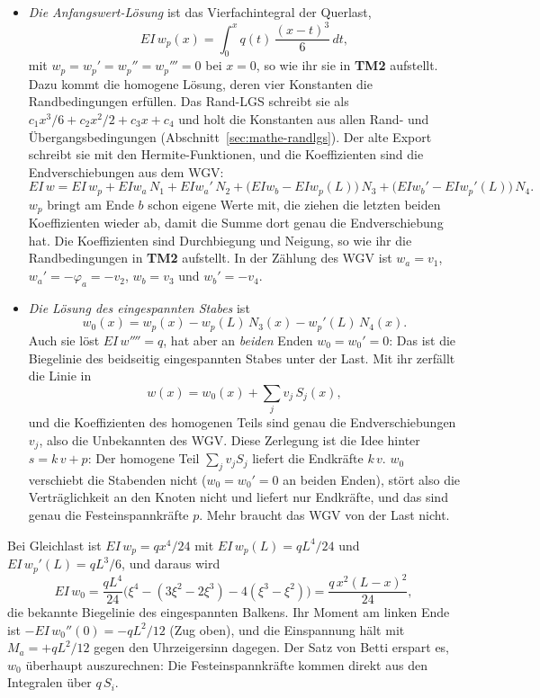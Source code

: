 \begin{itemize}
  \item \emph{Die Anfangswert-Lösung} ist das Vierfachintegral der Querlast,
        \[
          EI\,w_p(x) = \int_0^x q(t)\,\frac{(x-t)^3}{6}\,dt ,
        \]
        mit $w_p = w_p' = w_p'' = w_p''' = 0$ bei $x = 0$, so wie ihr sie in \textbf{TM2} aufstellt.
        Dazu kommt die homogene Lösung, deren vier Konstanten die Randbedingungen erfüllen. Das
        Rand-LGS schreibt sie als $c_1 x^3/6 + c_2 x^2/2 + c_3 x + c_4$ und holt die Konstanten aus
        allen Rand- und Übergangsbedingungen (Abschnitt~\ref{sec:mathe-randlgs}). Der alte Export
         schreibt sie mit den Hermite-Funktionen, und die Koeffizienten sind die
        Endverschiebungen aus dem WGV:
        \[
          EI\,w = EI\,w_p + EI w_a\,N_1 + EI w_a'\,N_2 + \bigl(EI w_b - EI w_p(L)\bigr)\,N_3
                  + \bigl(EI w_b' - EI w_p'(L)\bigr)\,N_4 .
        \]
        $w_p$ bringt am Ende $b$ schon eigene Werte mit, die ziehen die letzten beiden Koeffizienten
        wieder ab, damit die Summe dort genau die Endverschiebung hat. Die Koeffizienten sind
        Durchbiegung und Neigung, so wie ihr die Randbedingungen in \textbf{TM2} aufstellt. In der
        Zählung des WGV ist $w_a = v_1$, $w_a' = -\varphi_a = -v_2$, $w_b = v_3$ und $w_b' = -v_4$.
  \item \emph{Die Lösung des eingespannten Stabes} ist
        \[
          w_0(x) = w_p(x) - w_p(L)\,N_3(x) - w_p'(L)\,N_4(x) .
        \]
        Auch sie löst $EI\,w'''' = q$, hat aber an \emph{beiden} Enden $w_0 = w_0' = 0$: Das ist die
        Biegelinie des beidseitig eingespannten Stabes unter der Last. Mit ihr zerfällt die Linie in
        \[
          w(x) = w_0(x) + \sum_j v_j\,S_j(x) ,
        \]
        und die Koeffizienten des homogenen Teils sind genau die Endverschiebungen $v_j$, also die
        Unbekannten des WGV. Diese Zerlegung ist die Idee hinter $s = k\,v + p$: Der homogene Teil
        $\sum_j v_j S_j$ liefert die Endkräfte $k\,v$. $w_0$ verschiebt die Stabenden nicht
        ($w_0 = w_0' = 0$ an beiden Enden), stört also die Verträglichkeit an den Knoten nicht und
        liefert nur Endkräfte, und das sind genau die Festeinspannkräfte $p$. Mehr braucht das WGV
        von der Last nicht.
\end{itemize}

Bei Gleichlast ist $EI\,w_p = qx^4/24$ mit $EI\,w_p(L) = qL^4/24$ und $EI\,w_p'(L) = qL^3/6$, und
daraus wird
\[
  EI\,w_0 = \frac{qL^4}{24}\bigl(\xi^4 - (3\xi^2 - 2\xi^3) - 4(\xi^3 - \xi^2)\bigr)
          = \frac{q\,x^2 (L-x)^2}{24},
\]
die bekannte Biegelinie des eingespannten Balkens. Ihr Moment am linken Ende ist
$-EI\,w_0''(0) = -qL^2/12$ (Zug oben), und die Einspannung hält mit $M_a = +qL^2/12$ gegen den
Uhrzeigersinn dagegen. Der Satz von Betti erspart es, $w_0$ überhaupt auszurechnen: Die
Festeinspannkräfte kommen direkt aus den Integralen über $q\,S_i$.

